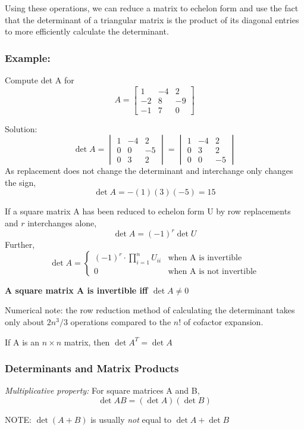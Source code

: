 \documentclass[12pt]{article} %
\begin{document}
Using these operations, we can reduce a matrix to echelon form and use the fact that the determinant of a triangular matrix is the product of its diagonal entries to more efficiently calculate the determinant. 

\subsubsection{Example:} Compute det A for 
$$A = \begin{bmatrix}
	1 & -4 & 2\\
	-2 & 8 & -9\\
	-1 & 7 & 0
\end{bmatrix}$$

Solution:
$$\det A = \begin{vmatrix}
	1 & -4 & 2\\
	0 & 0 & -5\\
	0 & 3 & 2
\end{vmatrix} = \begin{vmatrix}
	1 & -4 & 2\\
	0 & 3 & 2\\
	0 & 0 & -5
\end{vmatrix}$$
As replacement does not change the determinant and interchange only changes the sign,
$$\det A = - (1)(3)(-5) = 15$$

If a square matrix A has been reduced to echelon form U by row replacements and $r$ interchanges alone, 
$$\det A = (-1)^r \det U$$
Further,
$$\det A = \begin{cases}
	(-1)^r \cdot \prod\limits_{i=1}^n U_{ii}  & \text{when A is invertible}\\
	0 & \text{when A is not invertible}
\end{cases}$$

\textbf{A square matrix A is invertible iff $\det A \neq 0$}

Numerical note: the row reduction method of calculating the determinant takes only about $2n^3 / 3$ operations compared to the $n!$ of cofactor expansion.

If A is an $n \times n$ matrix, then $\det A^T = \det A$

\subsubsection{Determinants and Matrix Products}
\emph{Multiplicative property:} For square matrices A and B, $$\det AB = (\det A)(\det B)$$

NOTE: $\det (A+B)$ is usually \emph{not} equal to $\det A + \det B$
\end{document}
